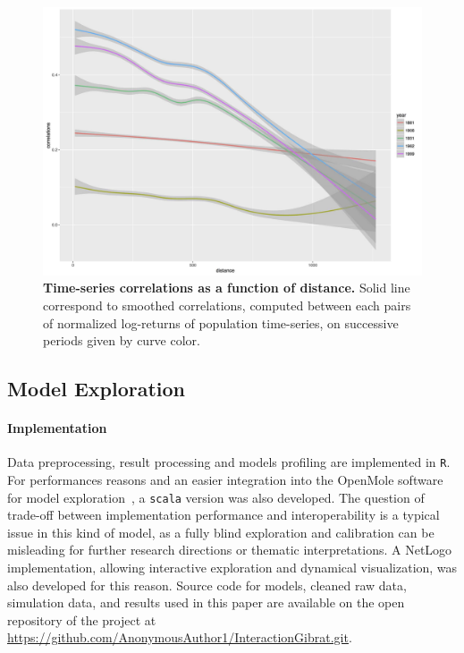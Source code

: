\documentclass[Royal,sageh,times]{sagej}
\begin{document}
\begin{figure}
\centering
\includegraphics[width=\textwidth]{figures/Fig1.jpg}
\caption{\textbf{Time-series correlations as a function of distance.} Solid line correspond to smoothed correlations, computed between each pairs of normalized log-returns of population time-series, on successive periods given by curve color.}
\label{fig:ts-correlations}
\end{figure}







\subsection*{Model Exploration}


\paragraph{Implementation}


Data preprocessing, result processing and models profiling are implemented in \texttt{R}. For performances reasons and an easier integration into the OpenMole software for model exploration~\citep{reuillon2013openmole}, a \texttt{scala} version was also developed. The question of  trade-off between implementation performance and interoperability is a typical issue in this kind of model, as a fully blind exploration and calibration can be misleading for further research directions or thematic interpretations. A NetLogo implementation, allowing interactive exploration and dynamical visualization, was also developed for this reason. Source code for models, cleaned raw data, simulation data, and results used in this paper are available on the open repository of the project at \url{https://github.com/AnonymousAuthor1/InteractionGibrat.git}.
\end{document}
